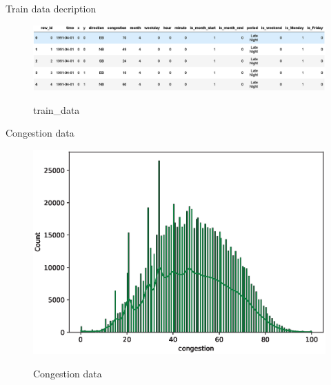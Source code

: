 \documentclass[
 size=14pt,
 paper=smartboard,  %
 mode=present, 		%
 display=slides, 	%
 style=tuliplab,  	%
 pauseslide,
 fleqn,leqno]{powerdot}
\begin{document}
\begin{slide}[toc=,bm=]{Train data decription}
\vspace{1.2cm}
\begin{figure}
	\setlength{\abovecaptionskip}{0.5cm}
    \centering
    \includegraphics[scale=0.38]{figure/train_data.eps}\\	
    \caption{train_data}
    \label{fig:train_data}
\end{figure}
\end{slide}
\begin{slide}[toc=,bm=]{Congestion data}
\begin{figure}
	\setlength{\abovecaptionskip}{-0.2cm} %
	\includegraphics[scale=0.9]{figure/congestion.eps}\\	
	\caption{Congestion data}
	\label{Congestion data}
\end{figure}
\end{slide}
\end{document}
